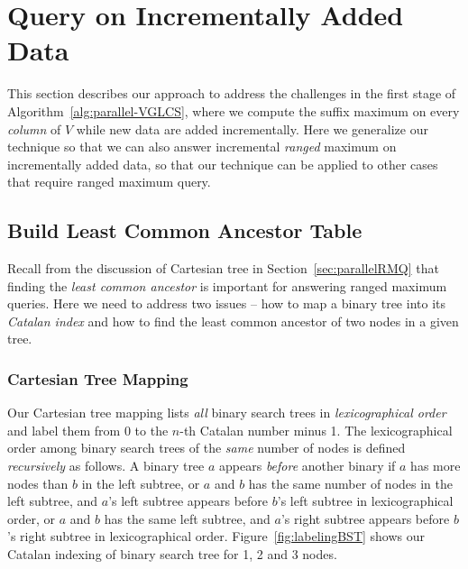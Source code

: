 \section{Query on Incrementally Added Data} \label{sec:QIUD}

This section describes our approach to address the challenges in the
first stage of Algorithm~\ref{alg:parallel-VGLCS}, where we compute
the suffix maximum on every {\em column} of $V$ while new data are
added incrementally.  Here we generalize our technique so that we can
also answer incremental {\em ranged} maximum on incrementally added
data, so that our technique can be applied to other cases that require
ranged maximum query.

%

\subsection{Build Least Common Ancestor Table}

Recall from the discussion of Cartesian tree in
Section~\ref{sec:parallelRMQ} that finding the {\em least common
  ancestor} is important for answering ranged maximum queries.  Here
we need to address two issues -- how to map a binary tree into its
{\em Catalan index} and how to find the least common ancestor of two
nodes in a given tree.


\subsubsection{Cartesian Tree Mapping}

Our Cartesian tree mapping lists {\em all} binary search trees in {\em
  lexicographical order} and label them from $0$ to the $n$-th Catalan
number minus 1.  The lexicographical order among binary search trees
of the {\em same} number of nodes is defined {\em recursively} as
follows.  A binary tree $a$ appears {\em before} another binary if $a$
has more nodes than $b$ in the left subtree, or $a$ and $b$ has the
same number of nodes in the left subtree, and $a$'s left subtree
appears before $b$'s left subtree in lexicographical order, or $a$ and
$b$ has the same left subtree, and $a$'s right subtree appears before
$b$'s right subtree in lexicographical order.
Figure~\ref{fig:labelingBST} shows our Catalan indexing of binary
search tree for 1, 2 and 3 nodes.

